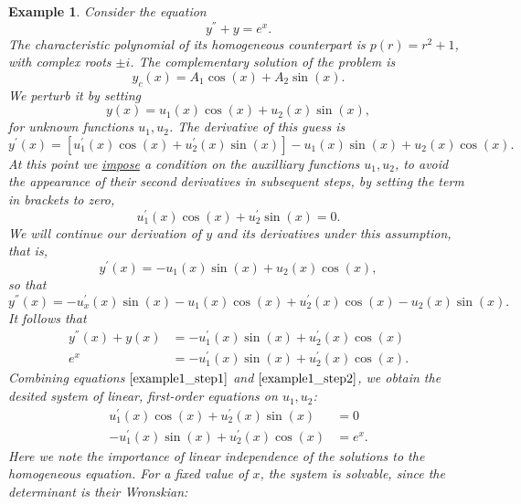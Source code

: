\documentclass[11pt]{amsart}
\newtheorem{example}{Example}
\numberwithin{equation}{section}
\begin{document}
\begin{example}
Consider the equation
\begin{equation*}
y^{''} + y = e^x.
\end{equation*}
The characteristic polynomial of its homogeneous counterpart is $p(r)=r^2+1$, with complex roots $\pm i$.  The complementary solution of the problem is 
\begin{equation*}
y_c(x)=A_1\cos(x)+A_2\sin(x).
\end{equation*}
We perturb it by setting 
\begin{equation*}
y(x)=u_1(x)\cos(x)+u_2(x)\sin(x),
\end{equation*}
for unknown functions $u_1,u_2$. The derivative of this guess is 
\begin{equation*}
y^{'}(x)=[u_{1}^{'}(x)\cos(x)+u_{2}^{'}(x)\sin(x)] -u_1(x)\sin(x)+u_2(x)\cos(x).
\end{equation*}
At this point we \underline{impose} a condition on the auxilliary functions $u_1,u_2$, to avoid the appearance of their second derivatives in subsequent steps, by setting the term in brackets to zero, 
\begin{equation}\label{example1_step1}
u_{1}^{'}(x)\cos(x)+u_{2}^{'}\sin(x)=0.
\end{equation}
We will continue our derivation of  $y$ and its derivatives under this assumption, that is, 
\begin{equation*}
y^{'}(x)= -u_1(x)\sin(x)+u_2(x)\cos(x),
\end{equation*}
so that 
\begin{equation*}
y^{''}(x) = -u_{x}^{'}(x)\sin(x)-u_1(x)\cos(x)+u_{2}^{'}(x)\cos(x)-u_2(x)\sin(x).
\end{equation*}
It follows that 
\begin{align}
\nonumber
y^{''}(x)+y(x) & =-u_{1}^{'}(x)\sin(x)+u_{2}^{'}(x)\cos(x) \\
\label{example1_step2}
e^{x} & = -u_{1}^{'}(x)\sin(x)+u_{2}^{'}(x)\cos(x) .
\end{align}
Combining equations $\eqref{example1_step1}$ and $\eqref{example1_step2}$, we obtain the desited system of linear, first-order equations on $u_1,u_2$:
\begin{align*}
u_{1}^{'}(x)\cos(x)+u_{2}^{'}(x)\sin(x) & =0\\
-u_{1}^{'}(x)\sin(x)+u_{2}^{'}(x)\cos(x) & = e^{x}.
\end{align*}
Here we note the importance of linear independence of the solutions to the homogeneous equation. For a fixed value of $x$, the system is solvable, since the determinant is their Wronskian:

\end{example}
\end{document}
